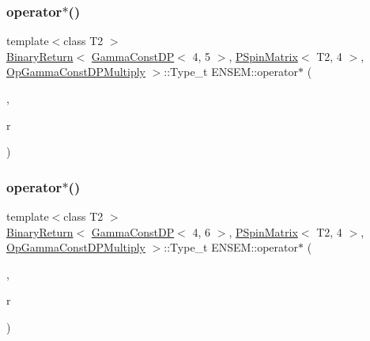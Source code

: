 \subsubsection{\texorpdfstring{operator$\ast$()}{operator*()}\hspace{0.1cm}{\footnotesize\ttfamily [38/64]}}
{\footnotesize\ttfamily template$<$class T2 $>$ \\
\mbox{\hyperlink{structENSEM_1_1BinaryReturn}{Binary\+Return}}$<$ \mbox{\hyperlink{classENSEM_1_1GammaConstDP}{Gamma\+Const\+DP}}$<$ 4, 5 $>$, \mbox{\hyperlink{classENSEM_1_1PSpinMatrix}{P\+Spin\+Matrix}}$<$ T2, 4 $>$, \mbox{\hyperlink{structENSEM_1_1OpGammaConstDPMultiply}{Op\+Gamma\+Const\+D\+P\+Multiply}} $>$\+::Type\+\_\+t E\+N\+S\+E\+M\+::operator$\ast$ (\begin{DoxyParamCaption}\item[{const \mbox{\hyperlink{classENSEM_1_1GammaConstDP}{Gamma\+Const\+DP}}$<$ 4, 5 $>$ \&}]{,  }\item[{const \mbox{\hyperlink{classENSEM_1_1PSpinMatrix}{P\+Spin\+Matrix}}$<$ T2, 4 $>$ \&}]{r }\end{DoxyParamCaption})\hspace{0.3cm}{\ttfamily [inline]}}

\mbox{\label{group__primspinmatrix_ga065100ce0a5fe4278e64d79e1b21c8c7}} 
\subsubsection{\texorpdfstring{operator$\ast$()}{operator*()}\hspace{0.1cm}{\footnotesize\ttfamily [39/64]}}
{\footnotesize\ttfamily template$<$class T2 $>$ \\
\mbox{\hyperlink{structENSEM_1_1BinaryReturn}{Binary\+Return}}$<$ \mbox{\hyperlink{classENSEM_1_1GammaConstDP}{Gamma\+Const\+DP}}$<$ 4, 6 $>$, \mbox{\hyperlink{classENSEM_1_1PSpinMatrix}{P\+Spin\+Matrix}}$<$ T2, 4 $>$, \mbox{\hyperlink{structENSEM_1_1OpGammaConstDPMultiply}{Op\+Gamma\+Const\+D\+P\+Multiply}} $>$\+::Type\+\_\+t E\+N\+S\+E\+M\+::operator$\ast$ (\begin{DoxyParamCaption}\item[{const \mbox{\hyperlink{classENSEM_1_1GammaConstDP}{Gamma\+Const\+DP}}$<$ 4, 6 $>$ \&}]{,  }\item[{const \mbox{\hyperlink{classENSEM_1_1PSpinMatrix}{P\+Spin\+Matrix}}$<$ T2, 4 $>$ \&}]{r }\end{DoxyParamCaption})\hspace{0.3cm}{\ttfamily [inline]}}


